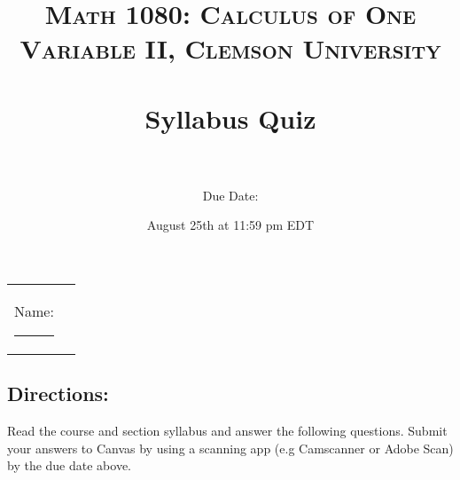 \documentclass{exam}
\title{	
\normalfont \normalsize 
\textsc{Math 1080: Calculus of One Variable II, Clemson University} \\ [25pt] %
\horrule{0.5pt} \\[0.4cm] %
\huge Syllabus Quiz\\ %
\horrule{0.5pt} \\[0.4cm] %
}
\author{Due Date:} %
\date{\normalsize August 25th at 11:59 pm EDT} %
\numberwithin{equation}{section} %
\numberwithin{figure}{section} %
\numberwithin{table}{section} %
\begin{document}
\addpoints
\unframedsolutions
\maketitle %
\begin{flushleft}
\begin{tabular}{l l}
Name: \rule{3.2in}{.01cm}  
\end{tabular}
\end{flushleft}

\begin{center}
\section*{\textbf{Directions:}}
\end{center}
Read the course and section syllabus and answer the following questions. Submit your answers to Canvas by using a scanning app (e.g Camscanner or Adobe Scan) by the due date above.\\

\begin{center}
\end{center}
\end{document}
